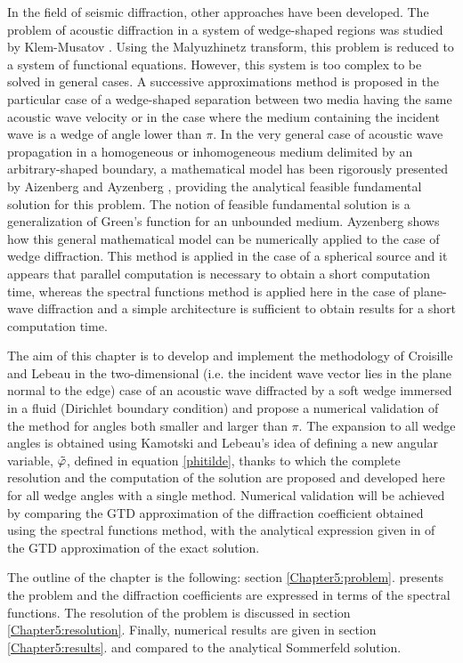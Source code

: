 In the field of seismic diffraction, other approaches have been developed. The problem of acoustic diffraction in a system of wedge-shaped regions was studied by Klem-Musatov \cite{Klem-Musatov}. Using the Malyuzhinetz transform, this problem is reduced to a system of functional equations. However, this system is too complex to be solved in general cases. A successive approximations method is proposed in the particular case of a wedge-shaped separation between two media having the same acoustic wave velocity or  in the case where the medium containing the incident wave is a wedge of angle lower than $\pi$. In the very general case of acoustic wave propagation in a homogeneous or inhomogeneous medium delimited by an arbitrary-shaped boundary, a mathematical model has been rigorously presented by Aizenberg and Ayzenberg \cite{Aizenberg}, providing the analytical feasible fundamental solution for this problem. The notion of feasible fundamental solution is a generalization of Green's function for an unbounded medium. Ayzenberg \cite{Ayzenberg} shows how this general mathematical model can be numerically applied to the case of wedge diffraction. This method is applied in the case of a spherical source and it appears that parallel computation is necessary to obtain a short computation time, whereas the spectral functions method is applied here in the case of plane-wave diffraction and a simple architecture is sufficient to obtain results for a short computation time. 

The aim of this chapter is to develop and implement the methodology of Croisille and Lebeau \cite{CroisilleLebeau} in the two-dimensional (i.e. the incident wave vector lies in the plane normal to the edge) case of an acoustic wave diffracted by a soft wedge immersed in a fluid (Dirichlet boundary condition) and propose a numerical validation of the method for angles both smaller and larger than $\pi$.  The expansion to all wedge angles is obtained using Kamotski and Lebeau's \cite{KamotskiLebeau} idea of defining a new angular variable, $\tilde{\varphi}$, defined in equation \eqref{phitilde}, thanks to which the complete resolution and the computation of the solution are proposed and developed here for all wedge angles with a single method. Numerical validation will be achieved by comparing the GTD approximation of the diffraction coefficient obtained using the spectral functions method, with the analytical expression given in \cite{Bouche,Bo} of the GTD approximation of the exact solution. 

The outline of the chapter is the following: section \ref{Chapter5:problem}. presents the problem and the diffraction coefficients are expressed in terms of the spectral functions. The resolution of the problem is discussed in section \ref{Chapter5:resolution}. Finally, numerical results are given in section \ref{Chapter5:results}. and compared to the analytical Sommerfeld solution. 

